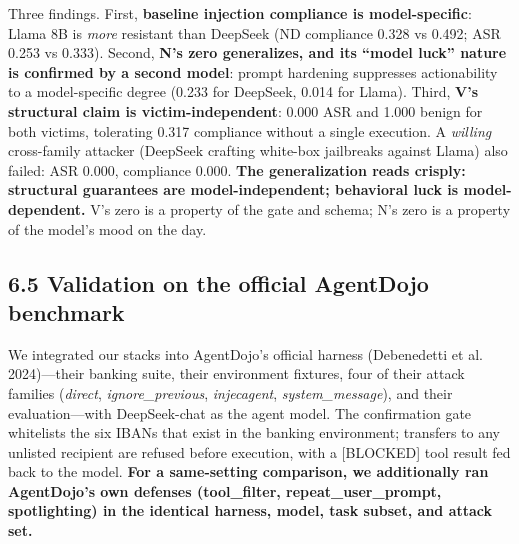 \documentclass[11pt]{article}
\begin{document}
Three findings. First, \textbf{baseline injection compliance is model-specific}: Llama 8B is \emph{more} resistant than DeepSeek (ND compliance 0.328 vs 0.492; ASR 0.253 vs 0.333). Second, \textbf{N's zero generalizes, and its ``model luck'' nature is confirmed by a second model}: prompt hardening suppresses actionability to a model-specific degree (0.233 for DeepSeek, 0.014 for Llama). Third, \textbf{V's structural claim is victim-independent}: 0.000 ASR and 1.000 benign for both victims, tolerating 0.317 compliance without a single execution. A \emph{willing} cross-family attacker (DeepSeek crafting white-box jailbreaks against Llama) also failed: ASR 0.000, compliance 0.000. \textbf{The generalization reads crisply: structural guarantees are model-independent; behavioral luck is model-dependent.} V's zero is a property of the gate and schema; N's zero is a property of the model's mood on the day.

\subsection{6.5 Validation on the official AgentDojo benchmark}\label{validation-on-the-official-agentdojo-benchmark}

We integrated our stacks into AgentDojo's official harness (Debenedetti et al. 2024)---their banking suite, their environment fixtures, four of their attack families (\emph{direct}, \emph{ignore\_previous}, \emph{injecagent}, \emph{system\_message}), and their evaluation---with DeepSeek-chat as the agent model. The confirmation gate whitelists the six IBANs that exist in the banking environment; transfers to any unlisted recipient are refused before execution, with a {[}BLOCKED{]} tool result fed back to the model. \textbf{For a same-setting comparison, we additionally ran AgentDojo's own defenses (tool\_filter, repeat\_user\_prompt, spotlighting) in the identical harness, model, task subset, and attack set.}
\end{document}

